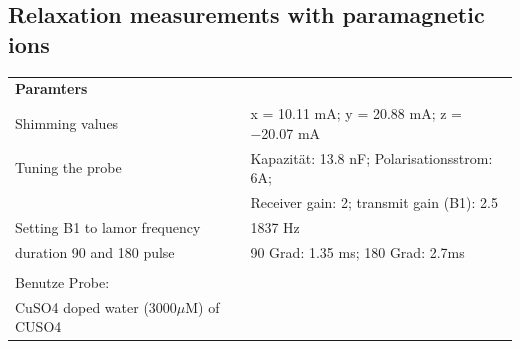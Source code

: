     \subsection{Relaxation measurements with paramagnetic ions}
\begin{tabular}{ll}

    {\bf Paramters} &            \\
    
    Shimming values & x = 10.11 mA; y = 20.88 mA; z = −20.07 mA \\
    
    Tuning the probe & Kapazität: 13.8 nF; Polarisationsstrom: 6A;\\
    & Receiver gain: 2; transmit gain (B1): 2.5\\
    
    Setting B1 to lamor frequency &    1837 Hz \\
    
    duration 90 and 180 pulse & 90 Grad: 1.35 ms; 180 Grad: 2.7ms \\
    
               &            \\
    
    Benutze Probe: & \\
    CuSO4 doped water (3000$\mu$M) of CUSO4 &            \\
    
    \end{tabular}  

